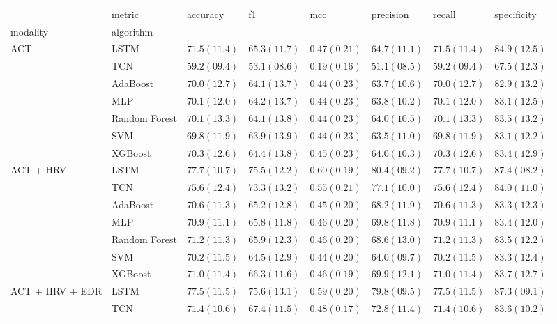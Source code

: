 \begin{tabular}{llllllll}
 & metric & accuracy & f1 & mcc & precision & recall & specificity \\
modality & algorithm &  &  &  &  &  &  \\
\multirow[c]{7}{*}{ACT} & LSTM & $71.5 (11.4)$ & $65.3 (11.7)$ & $0.47 (0.21)$ & $64.7 (11.1)$ & $71.5 (11.4)$ & $84.9 (12.5)$ \\
 & TCN & $59.2 (09.4)$ & $53.1 (08.6)$ & $0.19 (0.16)$ & $51.1 (08.5)$ & $59.2 (09.4)$ & $67.5 (12.3)$ \\
 & AdaBoost & $70.0 (12.7)$ & $64.1 (13.7)$ & $0.44 (0.23)$ & $63.7 (10.6)$ & $70.0 (12.7)$ & $82.9 (13.2)$ \\
 & MLP & $70.1 (12.0)$ & $64.2 (13.7)$ & $0.44 (0.23)$ & $63.8 (10.2)$ & $70.1 (12.0)$ & $83.1 (12.5)$ \\
 & Random Forest & $70.1 (13.3)$ & $64.1 (13.8)$ & $0.44 (0.23)$ & $64.0 (10.5)$ & $70.1 (13.3)$ & $83.5 (13.2)$ \\
 & SVM & $69.8 (11.9)$ & $63.9 (13.9)$ & $0.44 (0.23)$ & $63.5 (11.0)$ & $69.8 (11.9)$ & $83.1 (12.2)$ \\
 & XGBoost & $70.3 (12.6)$ & $64.4 (13.8)$ & $0.45 (0.23)$ & $64.0 (10.3)$ & $70.3 (12.6)$ & $83.4 (12.9)$ \\
\multirow[c]{7}{*}{ACT + HRV} & LSTM & $77.7 (10.7)$ & $75.5 (12.2)$ & $0.60 (0.19)$ & $80.4 (09.2)$ & $77.7 (10.7)$ & $87.4 (08.2)$ \\
 & TCN & $75.6 (12.4)$ & $73.3 (13.2)$ & $0.55 (0.21)$ & $77.1 (10.0)$ & $75.6 (12.4)$ & $84.0 (11.0)$ \\
 & AdaBoost & $70.6 (11.3)$ & $65.2 (12.8)$ & $0.45 (0.20)$ & $68.2 (11.9)$ & $70.6 (11.3)$ & $83.3 (12.3)$ \\
 & MLP & $70.9 (11.1)$ & $65.8 (11.8)$ & $0.46 (0.20)$ & $69.8 (11.8)$ & $70.9 (11.1)$ & $83.4 (12.0)$ \\
 & Random Forest & $71.2 (11.3)$ & $65.9 (12.3)$ & $0.46 (0.20)$ & $68.6 (13.0)$ & $71.2 (11.3)$ & $83.5 (12.2)$ \\
 & SVM & $70.2 (11.5)$ & $64.5 (12.9)$ & $0.44 (0.20)$ & $64.0 (09.7)$ & $70.2 (11.5)$ & $83.3 (12.4)$ \\
 & XGBoost & $71.0 (11.4)$ & $66.3 (11.6)$ & $0.46 (0.19)$ & $69.9 (12.1)$ & $71.0 (11.4)$ & $83.7 (12.7)$ \\
\multirow[c]{7}{*}{ACT + HRV + EDR} & LSTM & $77.5 (11.5)$ & $75.6 (13.1)$ & $0.59 (0.20)$ & $79.8 (09.5)$ & $77.5 (11.5)$ & $87.3 (09.1)$ \\
 & TCN & $71.4 (10.6)$ & $67.4 (11.5)$ & $0.48 (0.17)$ & $72.8 (11.4)$ & $71.4 (10.6)$ & $83.6 (10.2)$ \\

\end{tabular}

